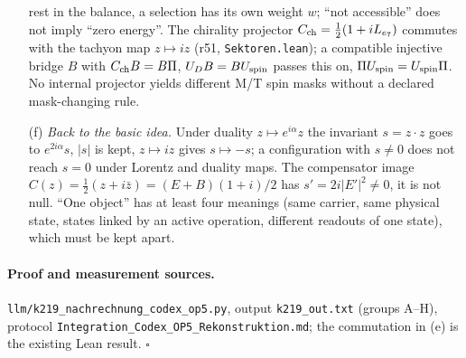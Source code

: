 \begin{enumerate}[leftmargin=2em]
rest in the balance, a selection has its own weight \(w\); ``not accessible'' does not imply ``zero energy''.  The chirality projector
\(C_{\rm ch}=\tfrac12(1+iL_{e_7})\) commutes with the tachyon map \(z\mapsto iz\) (r51, \texttt{Sektoren.lean}); a compatible injective bridge
\(B\) with \(C_{\rm ch}B=B\Pi\), \(U_DB=BU_{\rm spin}\) passes this on, \(\Pi U_{\rm spin}=U_{\rm spin}\Pi\).  No internal projector yields different M/T spin
masks without a declared mask-changing rule.
\item[(f)] \emph{Back to the basic idea.}  Under duality \(z\mapsto e^{i\alpha}z\) the invariant \(s=z\cdot z\) goes to \(e^{2i\alpha}s\), \(|s|\) is kept,
\(z\mapsto iz\) gives \(s\mapsto-s\); a configuration with \(s\neq0\) does not reach \(s=0\) under Lorentz and duality maps.  The compensator image
\(C(z)=\tfrac12(z+i\bar z)=(E+B)(1+i)/2\) has \(s'=2i|E'|^2\neq0\), it is not null.  ``One object'' has at least four meanings (same carrier, same physical
state, states linked by an active operation, different readouts of one state), which must be kept apart.
\end{enumerate}

\paragraph{Proof and measurement sources.}
\texttt{llm/\allowbreak k219\_\allowbreak nachrechnung\_\allowbreak codex\_\allowbreak op5.py}, output \texttt{k219\_\allowbreak out.txt} (groups A--H), protocol
\texttt{Integration\_\allowbreak Codex\_\allowbreak OP5\_\allowbreak Rekonstruktion.md}; the commutation in (e) is the existing Lean result.  \(\square\)

